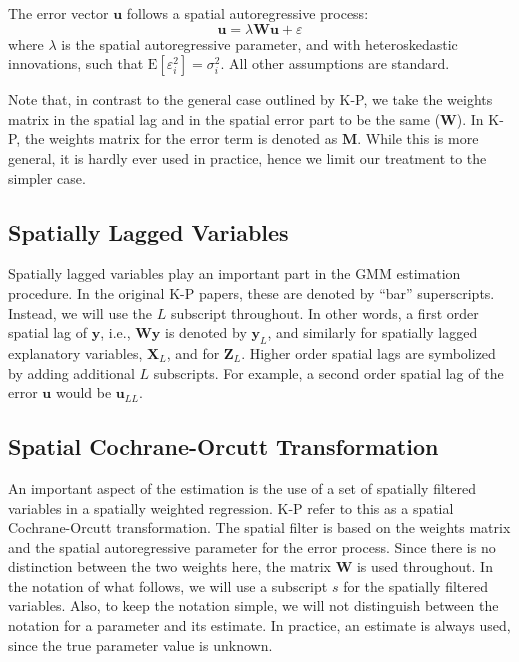 \documentclass{article}
\begin{document}
The error vector $\mathbf{u}$ follows a spatial autoregressive process:
\begin{equation*}
    \mathbf{u} = \lambda \mathbf{W u} + \varepsilon
    \label{model2}
\end{equation*}
where $\lambda$ is the spatial autoregressive parameter, and with heteroskedastic 
innovations, such that $\mbox{E}[\varepsilon_i^2] = \sigma_i^2$. All other assumptions
are standard.


Note that, in contrast to the general case outlined by K-P, we take the weights
matrix in the spatial lag and in the spatial error part to be the same ($\mathbf{W}$). In K-P, the
weights matrix for the error term is denoted as $\mathbf{M}$. While this is more
general, it is hardly ever used in practice, hence we limit our treatment to the
simpler case.

\subsection{Spatially Lagged Variables}
Spatially lagged variables play an important part in the GMM estimation procedure.
In the original K-P papers, these are denoted by ``bar'' superscripts. Instead, we will
use the $L$ subscript throughout. In other words, a first order spatial lag of $\mathbf{y}$, 
i.e., $\mathbf{Wy}$ is denoted by $\mathbf{y}_L$, and similarly for spatially lagged
explanatory variables, $\mathbf{X}_L$, and for $\mathbf{Z}_L$. Higher order spatial lags
are symbolized by adding additional $L$ subscripts. For example, a second order 
spatial lag of the error $\mathbf{u}$ would be $\mathbf{u}_{LL}$.


\subsection{Spatial Cochrane-Orcutt Transformation}
An important aspect of the estimation is the use of a set of spatially filtered variables
in a spatially weighted regression. K-P refer to this as a spatial Cochrane-Orcutt transformation.
The spatial filter is based on the weights matrix  and the
spatial autoregressive parameter for the error process. Since there is no
distinction between the two weights here, the matrix $\mathbf{W}$ is used throughout.
In the notation of what follows, we will use a subscript $s$ for the spatially filtered variables. Also, to keep the notation simple, we will not distinguish between the notation
for a parameter and its estimate. In practice, an estimate is always used, since the true
parameter value is unknown.
\end{document}
